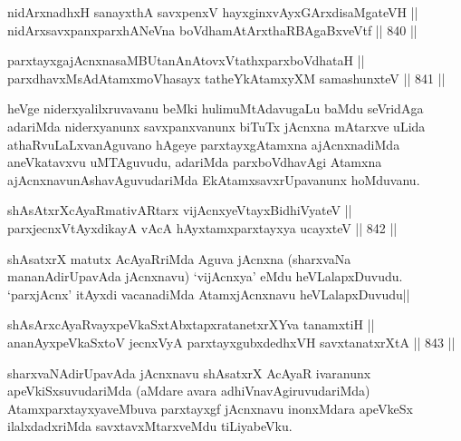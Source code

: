 \begin{shl}
nidArxnadhxH sanayxthA savxpenxV hayxginxvAyxGArxdisaMgateVH || \\
nidArxsavxpanxparxhANeVna boVdhamAtArxthaRBAgaBxveVtf \hfill || 840 ||  
\end{shl}
				
\begin{shl}
parxtayxgajAcnxnasaMBUtanAnAtovxVtathxparxboVdhataH || \\
parxdhavxMsAdAtamxmoVhasayx tatheYkAtamxyXM samashunxteV \hfill || 841 ||  
\end{shl}

\begin{artha}
heVge niderxyalilxruvavanu beMki hulimuMtAdavugaLu baMdu seVridAga adariMda niderxyanunx savxpanxvanunx biTuTx jAcnxna mAtarxve uLida athaRvuLaLxvanAguvano hAgeye parxtayxgAtamxna ajAcnxnadiMda aneVkatavxvu uMTAguvudu, adariMda parxboVdhavAgi Atamxna ajAcnxnavunAshavAguvudariMda EkAtamxsavxrUpavanunx hoMduvanu.
\end{artha}


\begin{shl}
shAsAtxrXcAyaRmativAR\s tarx vijAcnxyeVtayxBidhiVyateV || \\
parxjecnxVtAyxdikayA vAcA hAyxtamxparxtayxya ucayxteV \hfill || 842 ||  
\end{shl}

\begin{artha}
shAsatxrX matutx AcAyaRriMda Aguva jAcnxna (sharxvaNa mananAdirUpavAda jAcnxnavu) `vijAcnxya' eMdu heVLalapxDuvudu. `parxjAcnx' itAyxdi vacanadiMda AtamxjAcnxnavu heVLalapxDuvudu||
\end{artha}


\begin{shl}
shAsArxcAyaRvayxpeVkaSxtAbxtapxratanetxrXYva tanamxtiH || \\
ananAyxpeVkaSxtoV jecnxVyA parxtayxgubxdedhxVH savxtanatxrXtA \hfill || 843 ||  
\end{shl}

\begin{artha}
sharxvaNAdirUpavAda jAcnxnavu shAsatxrX AcAyaR ivaranunx apeVkiSxsuvudariMda (aMdare avara adhiVnavAgiruvudariMda) AtamxparxtayxyaveMbuva parxtayxgf jAcnxnavu inonxMdara apeVkeSx ilalxdadxriMda savxtavxMtarxveMdu tiLiyabeVku.
\end{artha}


